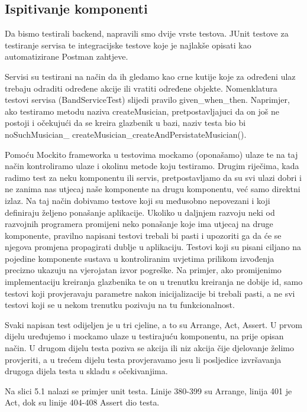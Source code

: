 			
			\subsection{Ispitivanje komponenti}
		
			
			
			Da bismo testirali backend, napravili smo dvije vrste testova. JUnit testove za testiranje servisa te integracijske testove koje je najlakše opisati kao automatizirane Postman zahtjeve.
			
			Servisi su testirani na način da ih gledamo kao crne kutije koje za određeni ulaz trebaju odraditi određene akcije ili vratiti određene objekte. Nomenklatura testovi servisa (BandServiceTest) slijedi pravilo given\_when\_then. Naprimjer, ako testiramo metodu naziva createMusician, pretpostavljajuci da on još ne postoji i očekujući da se kreira glazbenik u bazi, naziv testa bio bi 
			noSuchMusician\_
			createMusician\_createAndPersistateMusician().
			
			Pomoću Mockito frameworka u testovima mockamo (oponašamo) ulaze te na taj način kontroliramo ulaze i okolinu metode koju testiramo. Drugim riječima, kada radimo test za neku komponentu ili servis, pretpostavljamo da su svi ulazi dobri i ne zanima nas utjecaj naše komponente na drugu komponentu, već samo direktni izlaz. Na taj način dobivamo testove koji su međusobno nepovezani i koji definiraju željeno ponašanje aplikacije. Ukoliko u daljnjem razvoju neki od razvojnih programera promijeni neko ponašanje koje ima utjecaj na druge komponente, pravilno napisani testovi trebali bi pasti i upozoriti ga da će se njegova promjena propagirati dublje u aplikaciju. Testovi koji su pisani ciljano na pojedine komponente sustava u kontroliranim uvjetima prilikom izvođenja precizno ukazuju na vjerojatan izvor pogreške. Na primjer, ako promijenimo implementaciju kreiranja glazbenika te on u trenutku kreiranja ne dobije id, samo testovi koji provjeravaju parametre nakon inicijalizacije bi trebali pasti, a ne svi testovi koji se u nekom trenutku pozivaju na tu funkcionalnost.
			
			Svaki napisan test odijeljen je u tri cjeline, a to su Arrange, Act, Assert. U prvom dijelu uređujemo i mockamo ulaze u testirajuću komponentu, na prije opisan način. U drugom dijelu testa poziva se akcija ili niz akcija čije djelovanje želimo provjeriti, a u trećem dijelu testa provjeravamo jesu li posljedice izvršavanja drugoga dijela testa u skladu s očekivanjima.
			
			Na slici 5.1 nalazi se primjer unit testa. Linije 380-399 su Arrange, linija 401 je Act, dok su linije 404-408 Assert dio testa.
			
